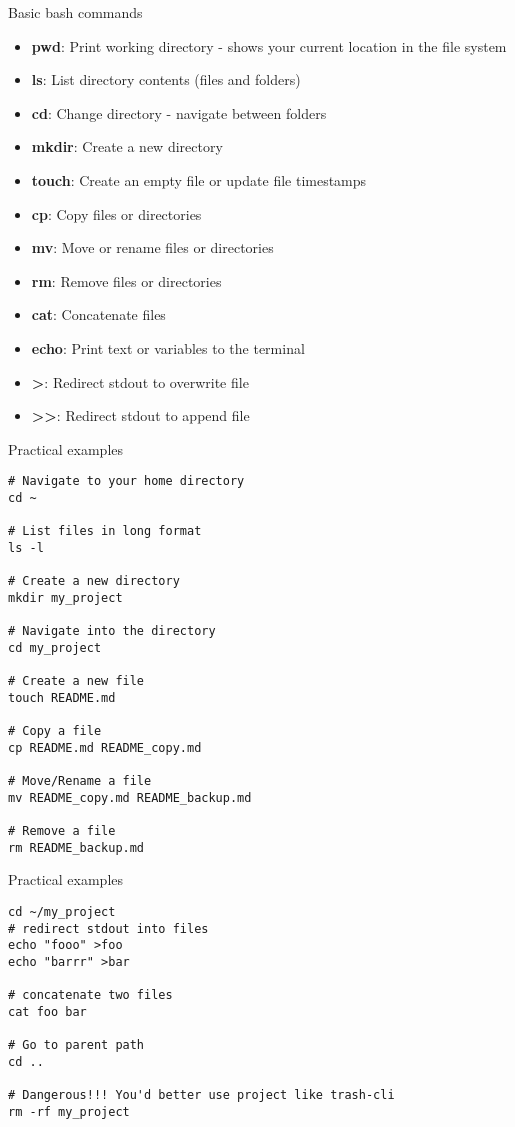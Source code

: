 \begin{frame}[fragile]{Basic bash commands}
	\begin{itemize}
		\item \textbf{pwd}: Print working directory - shows your current location in the file system
		\item \textbf{ls}: List directory contents (files and folders)
		\item \textbf{cd}: Change directory - navigate between folders
		\item \textbf{mkdir}: Create a new directory
		\item \textbf{touch}: Create an empty file or update file timestamps
		\item \textbf{cp}: Copy files or directories
		\item \textbf{mv}: Move or rename files or directories
		\item \textbf{rm}: Remove files or directories
		\item \textbf{cat}: Concatenate files
		\item \textbf{echo}: Print text or variables to the terminal
		\item \textbf{>}: Redirect stdout to overwrite file
		\item \textbf{>>}: Redirect stdout to append file
	\end{itemize}
\end{frame}

\begin{frame}[fragile]{Practical examples}
	\begin{verbatim}
# Navigate to your home directory
cd ~

# List files in long format
ls -l

# Create a new directory
mkdir my_project

# Navigate into the directory
cd my_project

# Create a new file
touch README.md

# Copy a file
cp README.md README_copy.md

# Move/Rename a file
mv README_copy.md README_backup.md

# Remove a file
rm README_backup.md
	\end{verbatim}
\end{frame}

\begin{frame}[fragile]{Practical examples}
	\begin{verbatim}
cd ~/my_project
# redirect stdout into files
echo "fooo" >foo
echo "barrr" >bar

# concatenate two files
cat foo bar

# Go to parent path
cd ..

# Dangerous!!! You'd better use project like trash-cli
rm -rf my_project
	\end{verbatim}
\end{frame}
